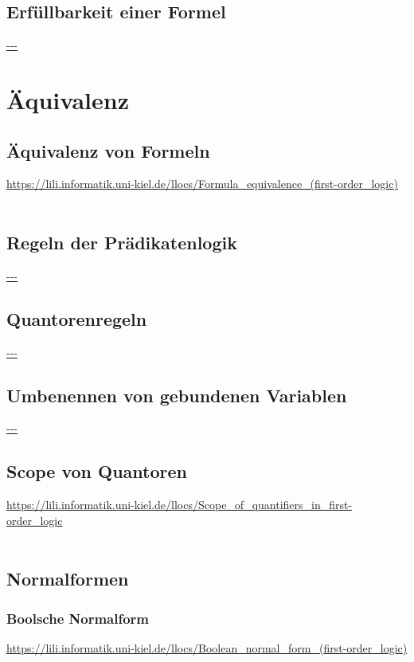 \documentclass[twocolumn]{article}
\begin{document}
    \subsection{Erfüllbarkeit einer Formel}
    \url{---}\\

    \section{Äquivalenz}

    \subsection{Äquivalenz von Formeln}
    \url{https://lili.informatik.uni-kiel.de/llocs/Formula_equivalence_(first-order_logic)}\\\\

    \subsection{Regeln der Prädikatenlogik}
    \url{---}\\

    \subsection{Quantorenregeln}
    \url{---}\\

    \subsection{Umbenennen von gebundenen Variablen}
    \url{---}\\

    \subsection{Scope von Quantoren}
    \url{https://lili.informatik.uni-kiel.de/llocs/Scope_of_quantifiers_in_first-order_logic}\\\\

    \subsection{Normalformen}

    \subsubsection{Boolsche Normalform}
    \url{https://lili.informatik.uni-kiel.de/llocs/Boolean_normal_form_(first-order_logic)}\\\\
\end{document}
